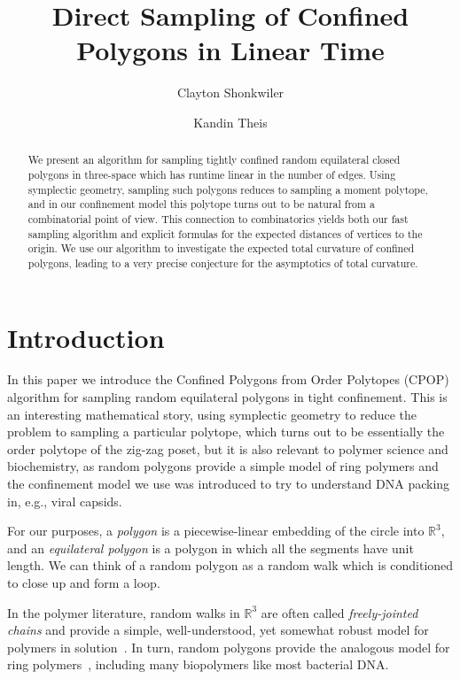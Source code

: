 \documentclass{article}
\title{Direct Sampling of Confined Polygons in Linear Time}
\author{Clayton Shonkwiler}
\author{Kandin Theis}
\affil{Department of Mathematics, Colorado State University, Fort Collins, CO, USA}
\date{}
\theoremstyle{definition}
\newcommand{\R}{\mathbb{R}}
\begin{document}
\maketitle

\begin{abstract}
	We present an algorithm for sampling tightly confined random equilateral closed polygons in three-space  which has runtime linear in the number of edges. Using symplectic geometry, sampling such polygons reduces to sampling a moment polytope, and in our confinement model this polytope turns out to be natural from a combinatorial point of view. This connection to combinatorics yields both our fast sampling algorithm and explicit formulas for the expected distances of vertices to the origin. We use our algorithm to investigate the expected total curvature of confined polygons, leading to a very precise conjecture for the asymptotics of total curvature.
\end{abstract}


\section{Introduction} %
\label{sec:introduction}

In this paper we introduce the Confined Polygons from Order Polytopes (CPOP) algorithm for sampling random equilateral polygons in tight confinement. This is an interesting mathematical story, using symplectic geometry to reduce the problem to sampling a particular polytope, which turns out to be essentially the order polytope of the zig-zag poset, but it is also relevant to polymer science and biochemistry, as random polygons provide a simple model of ring polymers and the confinement model we use was introduced to try to understand DNA packing in, e.g., viral capsids.

For our purposes, a \emph{polygon} is a piecewise-linear embedding of the circle into $\R^3$, and an \emph{equilateral polygon} is a polygon in which all the segments have unit length. We can think of a random polygon as a random walk which is conditioned to close up and form a loop. 

In the polymer literature, random walks in $\R^3$ are often called \emph{freely-jointed chains} and provide a simple, well-understood, yet somewhat robust model for polymers in solution~\cite{rayleighProblemRandomVibrations1919,floryStatisticalMechanicsChain1989,hughesRandomWalksRandom1995}. In turn, random polygons provide the analogous model for ring polymers~\cite{orlandiniStatisticalTopologyClosed2007}, including many biopolymers like most bacterial DNA. 
\end{document}
